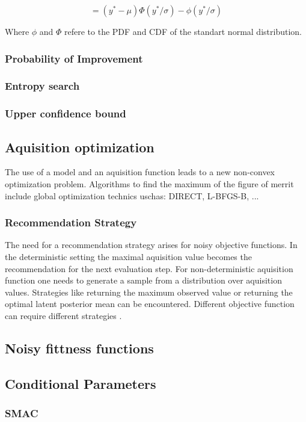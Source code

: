\documentclass[english]{article}
\begin{document}
$$ = (y^*-\mu)\Phi(y^*/\sigma) - \phi(y^*/\sigma) $$

Where $\phi$ and $\Phi$ refere to the PDF and CDF of the standart normal distribution.

\subsubsection{Probability of Improvement}
\subsubsection{Entropy search}
\subsubsection{Upper confidence bound}

\subsection{Aquisition optimization}
The use of a model and an aquisition function leads to a new non-convex optimization problem. Algorithms to find the maximum of the figure of merrit include global optimization technics uschas: DIRECT, L-BFGS-B, ...

\subsubsection{Recommendation Strategy}
The need for a recommendation strategy arises for noisy objective functions. In the deterministic setting the maximal aquisition value becomes the recommendation for the next evaluation step. For non-deterministic aquisition function one needs to generate a sample from a distribution over aquisition values. Strategies like returning the maximum observed value or returning the optimal latent posterior mean can be encountered. Different objective function can require different strategies \cite{hoffman_modular_2014}.

\subsection{Noisy fittness functions}

\subsection{Conditional Parameters}

\subsubsection{SMAC}
\end{document}
